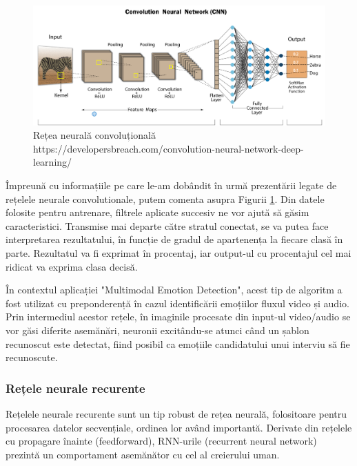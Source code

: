 \documentclass[a4paper, 12pt]{report}
\begin{document}
	\begin{figure}[h]
		\begin{center}
			\includegraphics[scale=0.29]{images/cnn.png}
		\end{center}
		\caption{Rețea neurală convoluțională\newline
			\hspace{\linewidth}https://developersbreach.com/convolution-neural-network-deep-learning/}
		\label{fig:cnn}
	\end{figure}
	
	Împreună cu informațiile pe care le-am dobândit în urmă prezentării legate de rețelele neurale convolutionale, putem comenta asupra Figurii \ref{fig:cnn}. Din datele folosite pentru antrenare, filtrele aplicate succesiv ne vor ajută să găsim caracteristici. Transmise mai departe către stratul conectat, se va putea face interpretarea rezultatului, în funcție de gradul de apartenența la fiecare clasă în parte. Rezultatul va fi exprimat în procentaj, iar output-ul cu procentajul cel mai ridicat va exprima clasa decisă.
	
	În contextul aplicației "Multimodal Emotion Detection", acest tip de algoritm a fost utilizat cu preponderență în cazul identificării emoțiilor fluxul video și audio. Prin intermediul acestor rețele, în imaginile procesate din input-ul video/audio se vor găsi diferite asemănări, neuronii excitându-se atunci când un șablon recunoscut este detectat, fiind posibil ca emoțiile candidatului unui interviu să fie recunoscute. 
	
	\clearpage
	\subsubsection{Rețele neurale recurente}
	Rețelele neurale recurente sunt un tip robust de rețea neurală, folositoare pentru procesarea datelor secvențiale, ordinea lor având importantă. Derivate din rețelele cu propagare înainte (feedforward), RNN-urile (recurrent neural network) prezintă un comportament asemănător cu cel al creierului uman.
\end{document}
